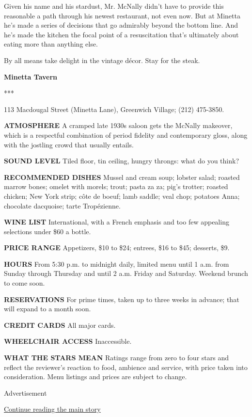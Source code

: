 Given his name and his stardust, Mr. McNally didn't have to provide this
reasonable a path through his newest restaurant, not even now. But at
Minetta he's made a series of decisions that go admirably beyond the
bottom line. And he's made the kitchen the focal point of a
resuscitation that's ultimately about eating more than anything else.

By all means take delight in the vintage décor. Stay for the steak.

\textbf{Minetta Tavern}

***

113 Macdougal Street (Minetta Lane), Greenwich Village; (212) 475-3850.

\textbf{ATMOSPHERE} A cramped late 1930s saloon gets the McNally
makeover, which is a respectful combination of period fidelity and
contemporary gloss, along with the jostling crowd that usually entails.

\textbf{SOUND LEVEL} Tiled floor, tin ceiling, hungry throngs: what do
you think?

\textbf{RECOMMENDED DISHES} Mussel and cream soup; lobster salad;
roasted marrow bones; omelet with morels; trout; pasta za za; pig's
trotter; roasted chicken; New York strip; côte de boeuf; lamb saddle;
veal chop; potatoes Anna; chocolate dacquoise; tarte Tropézienne.

\textbf{WINE LIST} International, with a French emphasis and too few
appealing selections under \$60 a bottle.

\textbf{PRICE RANGE} Appetizers, \$10 to \$24; entrees, \$16 to \$45;
desserts, \$9.

\textbf{HOURS} From 5:30 p.m. to midnight daily, limited menu until 1
a.m. from Sunday through Thursday and until 2 a.m. Friday and Saturday.
Weekend brunch to come soon.

\textbf{RESERVATIONS} For prime times, taken up to three weeks in
advance; that will expand to a month soon.

\textbf{CREDIT CARDS} All major cards.

\textbf{WHEELCHAIR ACCESS} Inaccessible.

\textbf{WHAT THE STARS MEAN} Ratings range from zero to four stars and
reflect the reviewer's reaction to food, ambience and service, with
price taken into consideration. Menu listings and prices are subject to
change.

Advertisement

\protect\hyperlink{after-bottom}{Continue reading the main story}

